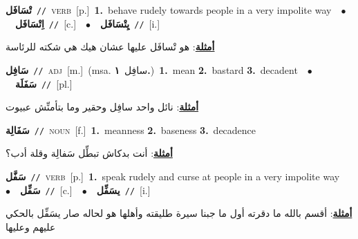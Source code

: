 \documentclass[10pt,a4paper,twoside]{article} %
\begin{document}
\begin{multicols}{2}
{\setlength\topsep{0pt}\textbf{\foreignlanguage{arabic}{تْسَافَل}}\ {\color{gray}\texttt{//}\color{black}}\ \textsc{verb}\ [p.]\ \textbf{1.}~behave rudely towards people in a very impolite way\ \ $\bullet$\ \ \setlength\topsep{0pt}\textbf{\foreignlanguage{arabic}{اِتْسَافَل}}\ {\color{gray}\texttt{//}\color{black}}\ [c.]\ \ $\bullet$\ \ \setlength\topsep{0pt}\textbf{\foreignlanguage{arabic}{يِتْسَافَل}}\ {\color{gray}\texttt{//}\color{black}}\ [i.]\  \begin{flushright}\color{gray}\foreignlanguage{arabic}{\textbf{\underline{\foreignlanguage{arabic}{أمثلة}}}: هو تْسافَل عليها عشان هيك هي شكته للرئاسة}\end{flushright}\color{black}} \vspace{2mm}

{\setlength\topsep{0pt}\textbf{\foreignlanguage{arabic}{سَافِل}}\ {\color{gray}\texttt{//}\color{black}}\ \textsc{adj}\ [m.]\ \color{gray}(msa. \foreignlanguage{arabic}{سافِل}~\foreignlanguage{arabic}{\textbf{١.}})\color{black}\ \textbf{1.}~mean  \textbf{2.}~bastard  \textbf{3.}~decadent\ \ $\bullet$\ \ \setlength\topsep{0pt}\textbf{\foreignlanguage{arabic}{سَفَلَة}}\ {\color{gray}\texttt{//}\color{black}}\ [pl.]\  \begin{flushright}\color{gray}\foreignlanguage{arabic}{\textbf{\underline{\foreignlanguage{arabic}{أمثلة}}}: نائل واحد سافِل وحقير وما بتأمنِّش عبيوت}\end{flushright}\color{black}} \vspace{2mm}

{\setlength\topsep{0pt}\textbf{\foreignlanguage{arabic}{سَفَالِة}}\ {\color{gray}\texttt{//}\color{black}}\ \textsc{noun}\ [f.]\ \textbf{1.}~meanness  \textbf{2.}~baseness  \textbf{3.}~decadence\  \begin{flushright}\color{gray}\foreignlanguage{arabic}{\textbf{\underline{\foreignlanguage{arabic}{أمثلة}}}: أنت بدكاش تبطِّل سَفالِة وقلة أدب؟}\end{flushright}\color{black}} \vspace{2mm}

{\setlength\topsep{0pt}\textbf{\foreignlanguage{arabic}{سَفَّل}}\ {\color{gray}\texttt{//}\color{black}}\ \textsc{verb}\ [p.]\ \textbf{1.}~speak rudely and curse at people in a very impolite way\ \ $\bullet$\ \ \setlength\topsep{0pt}\textbf{\foreignlanguage{arabic}{سَفِّل}}\ {\color{gray}\texttt{//}\color{black}}\ [c.]\ \ $\bullet$\ \ \setlength\topsep{0pt}\textbf{\foreignlanguage{arabic}{يسَفِّل}}\ {\color{gray}\texttt{//}\color{black}}\ [i.]\  \begin{flushright}\color{gray}\foreignlanguage{arabic}{\textbf{\underline{\foreignlanguage{arabic}{أمثلة}}}: أقسم بالله ما دقرته أول ما جبنا سيرة طليقته وأهلها هو لحاله صار يسَفِّل بالحكي عليهم وعليها}\end{flushright}\color{black}} \vspace{2mm}


\end{multicols}
\end{document}
